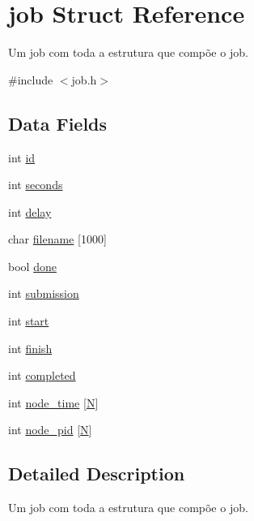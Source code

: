 \hypertarget{structjob}{}\section{job Struct Reference}
\label{structjob}


Um job com toda a estrutura que compõe o job.  




{\ttfamily \#include $<$job.\+h$>$}

\subsection*{Data Fields}
\begin{DoxyCompactItemize}
\item 
int \hyperlink{structjob_a7441ef0865bcb3db9b8064dd7375c1ea}{id}
\item 
int \hyperlink{structjob_a77bd4f876bdc3afed5acdd936f775d34}{seconds}
\item 
int \hyperlink{structjob_a6f1be1f780ff54ec75b41451cd4d90bd}{delay}
\item 
char \hyperlink{structjob_aa9a76d9571bf39c3d168d222f931ff86}{filename} \mbox{[}1000\mbox{]}
\item 
bool \hyperlink{structjob_a1d39aac66e12dae50a24cd7a9100ef33}{done}
\item 
int \hyperlink{structjob_a672ef807e8a5c395641b197cd1606fdc}{submission}
\item 
int \hyperlink{structjob_a37722a150250e2a5a98e5e0d11e53449}{start}
\item 
int \hyperlink{structjob_a57079404ddb95b02cddb408cc7c0e4b8}{finish}
\item 
int \hyperlink{structjob_a4eff08519948266efdd345aabe6ecbbb}{completed}
\item 
int \hyperlink{structjob_a4d48877440cfb156064d9d483b50bd2f}{node\+\_\+time} \mbox{[}\hyperlink{shutdown_2main_8c_a0240ac851181b84ac374872dc5434ee4}{N}\mbox{]}
\item 
int \hyperlink{structjob_a7cf416c88da5b0c8528923c4a453b7c7}{node\+\_\+pid} \mbox{[}\hyperlink{shutdown_2main_8c_a0240ac851181b84ac374872dc5434ee4}{N}\mbox{]}
\end{DoxyCompactItemize}


\subsection{Detailed Description}
Um job com toda a estrutura que compõe o job. 

